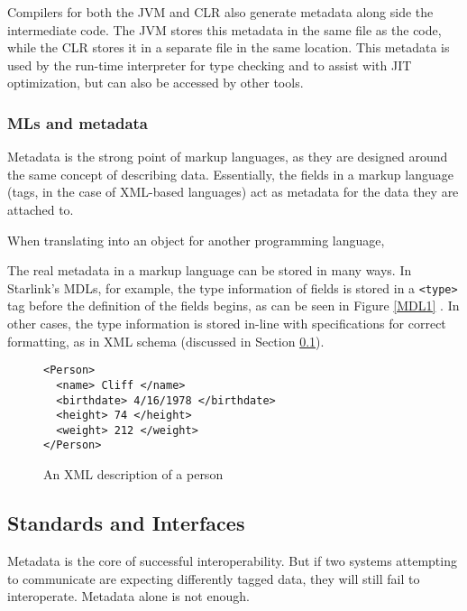 \documentclass{sig-alternate}
\begin{document}
Compilers for both the JVM and CLR also generate metadata along side the intermediate code. The JVM stores this metadata in the same file as the code, while the CLR stores it in a separate file in the same location. This metadata is used by the run-time interpreter for type checking and to assist with JIT optimization, but can also be accessed by other tools. 

\subsubsection*{MLs and metadata}
Metadata is the strong point of markup languages, as they are designed around the same concept of describing data. Essentially, the fields in a markup language (tags, in the case of XML-based languages) act as metadata for the data they are attached to.

When translating into an object for another programming language, 

The real metadata in a markup language can be stored in many ways. In Starlink's MDLs, for example, the type information of fields is stored in a {\tt <type>} tag before the definition of the fields begins, as can be seen in Figure \ref{MDL1} \cite{Bromberg:2011}. In other cases, the type information is stored in-line with specifications for correct formatting, as in XML schema (discussed in Section \ref{standards}).


\begin{figure}
\begin{verbatim}
<Person>
  <name> Cliff </name>
  <birthdate> 4/16/1978 </birthdate>
  <height> 74 </height>
  <weight> 212 </weight>
</Person>
\end{verbatim}
\caption{An XML description of a person}
\label{XMLexample}
\end{figure}



\subsection{Standards and Interfaces}\label{standards}
Metadata is the core of successful interoperability. But if two systems attempting to communicate are expecting differently tagged data, they will still fail to interoperate. Metadata alone is not enough.
\end{document}
